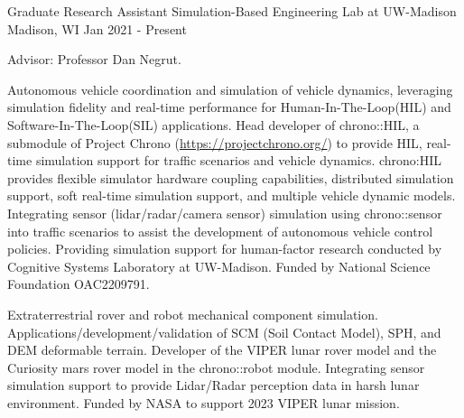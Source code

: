 

\begin{cventries}
	
  \cventry
	{Graduate Research Assistant} %
	{Simulation-Based Engineering Lab at UW-Madison} %
	{Madison, WI} %
	{Jan 2021 - Present} %
	{
		\begin{cvitems} %
			\item {Advisor: Professor Dan Negrut.}
			\item {Autonomous vehicle coordination and simulation of vehicle dynamics, leveraging simulation fidelity and real-time performance for Human-In-The-Loop(HIL) and Software-In-The-Loop(SIL) applications. Head developer of chrono::HIL, a submodule of Project Chrono (\url{https://projectchrono.org/}) to provide HIL, real-time simulation support for traffic scenarios and vehicle dynamics. chrono:HIL provides flexible simulator hardware coupling capabilities, distributed simulation support, soft real-time simulation support, and multiple vehicle dynamic models. Integrating sensor (lidar/radar/camera sensor) simulation using chrono::sensor into traffic scenarios to assist the development of autonomous vehicle control policies. Providing simulation support for human-factor research conducted by Cognitive Systems Laboratory at UW-Madison. Funded by National Science Foundation OAC2209791.}
			\item {Extraterrestrial rover and robot mechanical component simulation. Applications/development/validation of SCM (Soil Contact Model), SPH, and DEM deformable terrain. Developer of the VIPER lunar rover model and the Curiosity mars rover model in the chrono::robot module. Integrating sensor simulation support to provide Lidar/Radar perception data in harsh lunar environment. Funded by NASA to support 2023 VIPER lunar mission.}
		\end{cvitems}
	}
		
	


\end{cventries}
